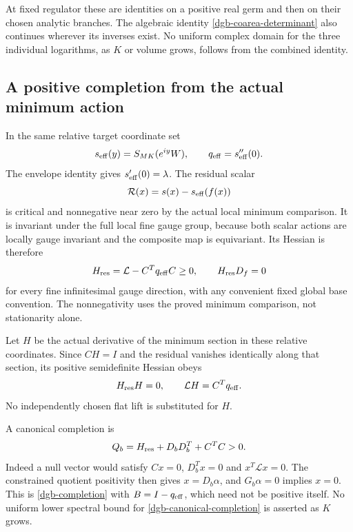 At fixed regulator these are identities on a positive real
germ and then on their chosen analytic branches. The algebraic
identity \eqref{dgb-coarea-determinant} also continues wherever
its inverses exist. No uniform complex domain for the three
individual logarithms, as $K$ or volume grows, follows from
the combined identity.

\subsection{A positive completion from the actual minimum action}
\label{dgb-residual-section}

In the same relative target coordinate set
\[
 s_{\rm eff}(y)=S_{MK}(e^{iy}W),\qquad
 q_{\rm eff}=s_{\rm eff}''(0).
\]
The envelope identity gives $s_{\rm eff}'(0)=\lambda$.
The residual scalar
\[
                 \mathcal R(x)=s(x)-s_{\rm eff}(f(x))
\]
is critical and nonnegative near zero by the actual local
minimum comparison. It is invariant under the full local
fine gauge group, because both scalar actions are locally
gauge invariant and the composite map is equivariant.
Its Hessian is therefore
\begin{equation}
 H_{\rm res}=\mathcal L-C^Tq_{\rm eff}C\geq0,\qquad
 H_{\rm res}D_f=0
 \label{dgb-residual-Hessian}
\end{equation}
for every fine infinitesimal gauge direction, with any
convenient fixed global base convention.
The nonnegativity uses the proved minimum comparison,
not stationarity alone.

Let $H$ be the actual derivative of the minimum section in
these relative coordinates. Since $CH=I$ and the residual
vanishes identically along that section, its positive
semidefinite Hessian obeys
\begin{equation}
                     H_{\rm res}H=0,\qquad
                     \mathcal LH=C^Tq_{\rm eff}.
 \label{dgb-residual-lift}
\end{equation}
No independently chosen flat lift is substituted for $H$.

A canonical completion is
\begin{equation}
                Q_b=H_{\rm res}+D_bD_b^T+C^TC>0.
 \label{dgb-canonical-completion}
\end{equation}
Indeed a null vector would satisfy $Cx=0$, $D_b^Tx=0$
and $x^T\mathcal Lx=0$. The constrained quotient positivity
then gives $x=D_b\alpha$, and $G_b\alpha=0$ implies $x=0$.
This is \eqref{dgb-completion} with $B=I-q_{\rm eff}$,
which need not be positive itself. No uniform lower
spectral bound for \eqref{dgb-canonical-completion} is
asserted as $K$ grows.

